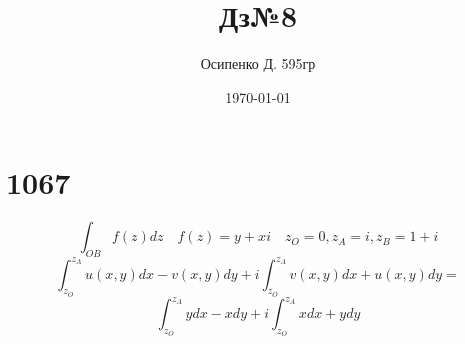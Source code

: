 \documentclass[a4paper, 12pt]{article}
\title{Дз№8}
\author{Осипенко Д. 595гр}
\date{\today}
\begin{document}
\sffamily
\maketitle
\section*{1067}
\[
	\int_{OB}f(z)dz \quad f(z) = y+xi \quad z_O = 0,z_A = i,z_B = 1+i
\]
\[
	\int_{z_O}^{z_A}u(x,y)dx - v(x,y)dy + i\int_{z_O}^{z_A}v(x,y)dx + u(x,y)dy = 
\]
\[
	\int_{z_O}^{z_A}ydx - xdy + i\int_{z_O}^{z_A}xdx + ydy
\]
\end{document}
